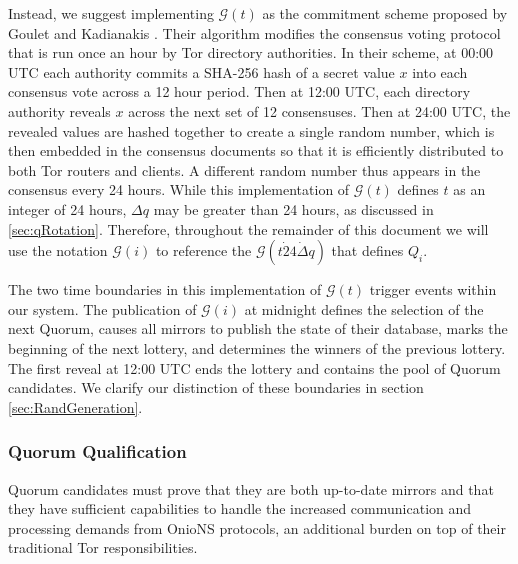 \documentclass[USenglish,oneside,twocolumn]{article}
\begin{document}
Instead, we suggest implementing $ \mathcal{G}(t) $ as the commitment scheme proposed by Goulet and Kadianakis \cite{GouletCommitReveal}. Their algorithm modifies the consensus voting protocol that is run once an hour by Tor directory authorities. In their scheme, at 00:00 UTC each authority commits a SHA-256 hash of a secret value $ x $ into each consensus vote across a 12 hour period. Then at 12:00 UTC, each directory authority reveals $ x $ across the next set of 12 consensuses. Then at 24:00 UTC, the revealed values are hashed together to create a single random number, which is then embedded in the consensus documents so that it is efficiently distributed to both Tor routers and clients. A different random number thus appears in the consensus every 24 hours. While this implementation of $ \mathcal{G}(t) $ defines $ t $ as an integer of 24 hours, $ \Delta q $ may be greater than 24 hours, as discussed in \ref{sec:qRotation}. Therefore, throughout the remainder of this document we will use the notation $ \mathcal{G}(i) $ to reference the $ \mathcal{G}(t \dot 24 \dot \Delta q) $ that defines $ Q_{i} $.


The two time boundaries in this implementation of $ \mathcal{G}(t) $ trigger events within our system. The publication of $ \mathcal{G}(i) $ at midnight defines the selection of the next Quorum, causes all mirrors to publish the state of their database, marks the beginning of the next lottery, and determines the winners of the previous lottery. The first reveal at 12:00 UTC ends the lottery and contains the pool of Quorum candidates. We clarify our distinction of these boundaries in section \ref{sec:RandGeneration}. 


\subsubsection{Quorum Qualification} %
\label{sec:qQualification}

Quorum candidates must prove that they are both up-to-date mirrors and that they have sufficient capabilities to handle the increased communication and processing demands from OnioNS protocols, an additional burden on top of their traditional Tor responsibilities.
\end{document}
